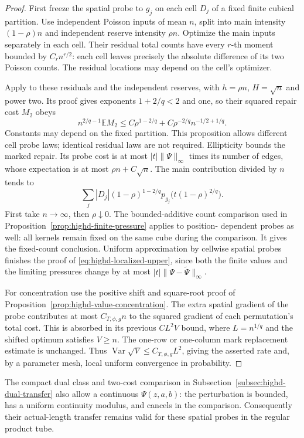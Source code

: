 \documentclass[11pt,reqno]{amsart}
\theoremstyle{definition}
\theoremstyle{remark}
\numberwithin{equation}{section}
\newcommand{\E}{\mathbb E}
\begin{document}
\begin{proof}
First freeze the spatial probe to \(g_j\) on each cell \(D_j\)
of a fixed finite cubical partition. Use independent Poisson inputs
of mean \(n\), split into main intensity \((1-\rho)n\) and
independent reserve intensity \(\rho n\). Optimize the main
inputs separately in each cell. Their residual total counts have
every \(r\)-th moment bounded by \(C_r n^{r/2}\): each cell
leaves precisely the absolute difference of its two Poisson counts.
The residual locations may depend on the cell's optimizer.

Apply \cite[Proposition~6.3]{GoldmanTrevisan2023} to these residuals
and the independent reserves, with \(h=\rho n\), \(H=\sqrt n\)
and power two. Its proof gives exponents \(1+2/q<2\) and one,
so their squared repair cost \(M_2\) obeys
\[
n^{2/q-1}\E M_2
 \le C\rho^{1-2/q}+C\rho^{-2/q}n^{-1/2+1/q}.
\]
Constants may depend on the fixed partition. This proposition
allows different cell probe laws; identical residual laws are not
required. Ellipticity bounds the marked repair. Its probe cost is
at most \(|t|\|\Psi\|_\infty\) times its number of edges,
whose expectation is at most \(\rho n+C\sqrt n\).
The main contribution divided by \(n\) tends to
\[
\sum_j |D_j|(1-\rho)^{1-2/q}
 p_{g_j}\bigl(t(1-\rho)^{2/q}\bigr).
\]
First take \(n\to\infty\), then \(\rho\downarrow0\).
The bounded-additive count comparison used in
Proposition~\ref{prop:highd-finite-pressure} applies to position-
dependent probes as well: all kernels remain fixed on the same cube
during the comparison. It gives the fixed-count conclusion.
Uniform approximation by cellwise spatial probes finishes the proof
of \eqref{eq:highd-localized-upper}, since both the finite values
and the limiting pressures change by at most
\(|t|\|\Psi-\widetilde\Psi\|_\infty\).

For concentration use the positive shift and square-root proof of
Proposition~\ref{prop:highd-value-concentration}. The extra spatial
gradient of the probe contributes at most \(C_{T,\phi,g}n\)
to the squared gradient of each permutation's total cost. This is
absorbed in its previous \(CL^2V\) bound, where \(L=n^{1/q}\)
and the shifted optimum satisfies \(V\ge n\). The one-row or
one-column mark replacement estimate is unchanged. Thus
\(\operatorname{Var}\sqrt V\le C_{T,\phi,g}L^2\), giving
the asserted rate and, by a parameter mesh, local uniform convergence
in probability.
\end{proof}

The compact dual class and two-cost comparison in
Subsection~\ref{subsec:highd-dual-transfer} also allow a continuous
\(\Psi(z,a,b)\): the perturbation is bounded, has a uniform
continuity modulus, and cancels in the comparison. Consequently
their actual-length transfer remains valid for these spatial probes
in the regular product tube.
\end{document}
